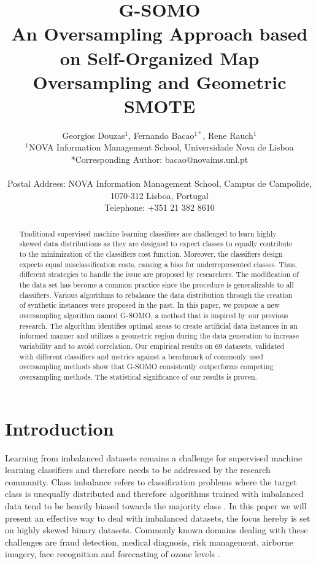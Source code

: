 \documentclass[parskip=full]{scrartcl}
\title{G-SOMO \\ \LARGE{An Oversampling Approach based on Self-Organized Map Oversampling and Geometric SMOTE}}
\author{
	Georgios Douzas\(^{1}\), Fernando Bacao\(^{1*}\), Rene Rauch\(^{1}\)
	\\
	\small{\(^{1}\)NOVA Information Management School, Universidade Nova de Lisboa}
	\\
	\small{*Corresponding Author: bacao@novaims.unl.pt}
	\\
	\\
	\small{Postal Address: NOVA Information Management School, Campus de Campolide, 1070-312 Lisboa, Portugal}
	\\
	\small{Telephone: +351 21 382 8610}
}
\date{}
\begin{document}
\maketitle

\begin{abstract}
Traditional supervised machine learning classifiers are challenged to learn
highly skewed data distributions as they are designed to expect classes to
equally contribute to the minimization of the classifiers cost function.
Moreover, the classifiers design expects equal misclassification costs, causing
a bias for underrepresented classes. Thus, different strategies to handle the
issue are proposed by researchers. The modification of the data set has become a
common practice since the procedure is generalizable to all classifiers. Various
algorithms to rebalance the data distribution through the creation of synthetic
instances were proposed in the past.  In this paper, we propose a new
oversampling algorithm named G-SOMO, a method that is inspired by our previous
research. The algorithm identifies optimal areas to create artificial data
instances in an informed manner and utilizes a geometric region during the data
generation to increase variability and to avoid correlation. Our empirical
results on 69 datasets, validated with different classifiers and metrics against
a benchmark of commonly used oversampling methods show that G-SOMO consistently
outperforms competing oversampling methods. The statistical significance of our
results is proven. 
\end{abstract}

\section{Introduction}

Learning from imbalanced datasets remains a challenge for supervised machine
learning classifiers and therefore needs to be addressed by the research
community. Class imbalance refers to classification problems where the target
class is unequally distributed and therefore algorithms trained with imbalanced
data tend to be heavily biased towards the majority class \cite{Hoens2013}. In
this paper we will present an effective way to deal with imbalanced datasets,
the focus hereby is set on highly skewed binary datasets. Commonly known domains
dealing with these challenges are fraud detection, medical diagnosis, risk
management, airborne imagery, face recognition and forecasting of ozone levels
\cite{Akbani2004}.
\end{document}

